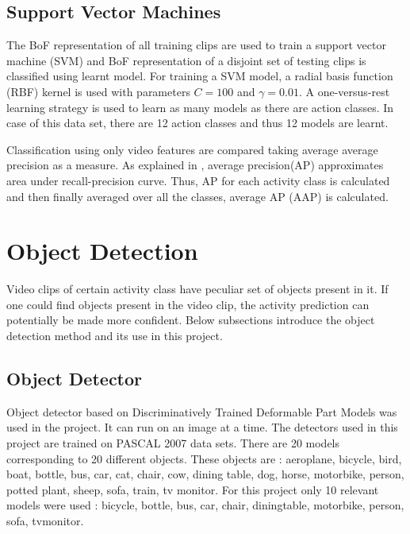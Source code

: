 \subsection{Support Vector Machines}
\label{AP_definition}
The BoF representation of all training clips are used to train a
support vector machine (SVM) and BoF representation of a disjoint set of testing clips is classified using
learnt model. For training a SVM model, a radial basis function (RBF) kernel is used with parameters $C = 100$ 
and $\gamma = 0.01$. A one-versus-rest learning strategy is used to learn as many models as there are action classes.
In case of this data set, there are 12 action classes and thus 12 models are learnt.

Classification using only video features are compared taking  average average precision as a measure.
As explained in \cite{actionsInContext}, average precision(AP) approximates area under recall-precision curve.
Thus, AP for each activity class is calculated and then finally averaged over all the classes, average AP (AAP) is calculated.

\section{Object Detection}

\label{section_OBJ}


Video clips of certain activity class have peculiar set of objects present in it.
If one could find objects present in the video clip, the activity prediction can 
potentially be made more confident. Below subsections introduce the object detection
method and its use in this project.

\subsection{Object Detector}
Object detector based on Discriminatively Trained Deformable Part Models \cite{voc-release4} was used in
the project. It can run on an image at a time. The detectors used in this project are trained on PASCAL 2007 data sets.
There are 20 models corresponding to 20 different objects.
These objects are : aeroplane, bicycle,
bird, boat, bottle, bus, car, cat, chair, cow, dining table, dog, horse,
motorbike, person, potted plant, sheep, sofa, train, tv monitor.
For this project only 10 relevant models were used : bicycle, bottle, bus, car,
chair, diningtable, motorbike, person, sofa, tvmonitor.

